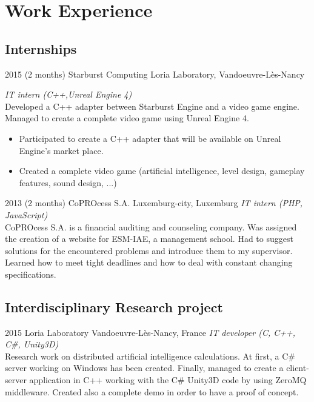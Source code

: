\documentclass[]{friggeri-cv} %
\begin{document}

\section{Work Experience}

\subsection{Internships}

\begin{entrylist}


\entry
{2015 (2 months)}
{Starburst Computing}
{Loria Laboratory, Vandoeuvre-Lès-Nancy}
{\emph{IT intern (C++,Unreal Engine 4)} \\
Developed a C++ adapter between Starburst Engine and a video game engine. Managed to create a complete video game using Unreal Engine 4. 
\begin{itemize}
\item Participated to create a C++ adapter that will be available on Unreal Engine's market place.
\item Created a complete video game (artificial intelligence, level design, gameplay features, sound design, ...)
\end{itemize}}

\entry
{2013 (2 months)}
{CoPROcess S.A.}
{Luxemburg-city, Luxemburg}
{\emph{IT intern (PHP, JavaScript)} \\
CoPROcess S.A. is a financial auditing and counseling company. Was assigned the creation of a website for ESM-IAE, a management school. Had to suggest solutions for the encountered problems and introduce them to my supervisor. Learned how to meet tight deadlines and how to deal with constant changing specifications.
}


\end{entrylist}

\subsection{Interdisciplinary Research project}

\begin{entrylist}

\entry
{2015}
{Loria Laboratory}
{Vandoeuvre-Lès-Nancy, France}
{ \emph {IT developer (C, C++, C\#, Unity3D)}\\
Research work on distributed artificial intelligence calculations. At first, a C\# server working on Windows has been created. Finally, managed to create a client-server application in C++ working with the C\# Unity3D code by using ZeroMQ middleware. Created also a complete demo in order to have a proof of concept. }


\end{entrylist}
\end{document}
